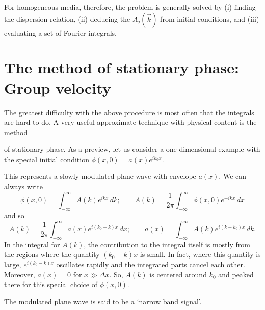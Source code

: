 For homogeneous media, therefore, the problem is generally solved by (i) finding the
dispersion relation, (ii) deducing the $A_j(\vec{k})$ from initial conditions, and (iii)
evaluating a set of Fourier integrals.

\section{The method of stationary phase: Group velocity}

The greatest difficulty with the above procedure is most often that the integrals are
hard to do. A very useful approximate technique with physical content is the method

\sourcepagebreak

of stationary phase. As a preview, let us consider a one-dimensional example with the
special initial condition $\phi(x,0)=a(x)e^{ik_0x}$.

\par\smallskip
\begin{center}
	
	\wavefiguremark
\end{center}
\smallskip

This represents a slowly modulated plane wave with envelope $a(x)$. We can always
write
\[
	\phi(x,0)=\int_{-\infty}^{\infty}A(k)e^{ikx}\,dk;
	\qquad
	A(k)=\frac{1}{2\pi}\int_{-\infty}^{\infty}\phi(x,0)e^{-ikx}\,dx
\]
and so
\[
	A(k)=\frac{1}{2\pi}\int_{-\infty}^{\infty}
	a(x)e^{i(k_0-k)x}\,dx;
	\qquad
	a(x)=\int_{-\infty}^{\infty}A(k)e^{i(k-k_0)x}\,dk.
\]
In the integral for $A(k)$, the contribution to the integral itself is mostly from the
regions where the quantity $(k_0-k)x$ is small. In fact, where this quantity is large,
$e^{i(k_0-k)x}$ oscillates rapidly and the integrated parts cancel each other. Moreover,
$a(x)=0$ for $x\gg\Delta x$. So, $A(k)$ is centered around $k_0$ and peaked there for
this special choice of $\phi(x,0)$.

\par\smallskip
\begin{center}
	
	\wavefiguremark
\end{center}
\smallskip

The modulated plane wave is said to be a `narrow band signal'.

